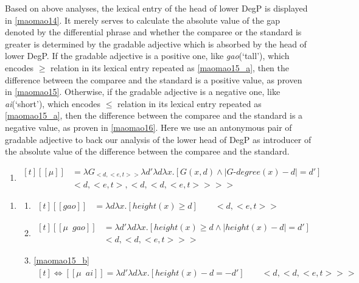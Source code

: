 \documentclass{ctexart}
\begin{document}
Based on above analyses, the lexical entry of the head of lower DegP is displayed in \ref{maomao14}.  It merely serves to calculate the absolute value of the gap denoted by the differential phrase and whether the comparee or the standard is greater is determined by the gradable adjective which is absorbed by the head of lower DegP. If the gradable adjective is a positive one, like \textit{gao}(`tall'), which encodes $\geq$ relation in its lexical entry repeated as \ref{maomao15_a}, then the difference between the comparee and the standard is a positive value, as proven in \ref{maomao15}. Otherwise, if the gradable adjective is a negative one, like \textit{ai}(`short'), which encodes $\leq$ relation in its lexical entry repeated as \ref{maomao15_a}, then the difference between the comparee and the standard is a negative value, as proven in \ref{maomao16}. Here we use an antonymous pair of gradable adjective to back our analysis of the lower head of DegP as introducer  of the absolute value of the difference between the comparee and the standard.

\begin{enumerate}
    \item \label{maomao14}
    $\begin{aligned}[t]
        [\![\mu]\!] &= \lambda G_{<d,<e,t>>} \lambda d' \lambda d \lambda x.[G(x,d) \land | G \mbox{-} degree(x) - d | = d'] \\
        & <d,<e,t>,<d,<d,<e,t>>>>
    \end{aligned}$
\end{enumerate}


\begin{enumerate}
    \item \label{maomao15}
    \begin{enumerate}
        \item \label{maomao15_a}
        $\begin{aligned}[t]
            [\![gao]\!] &= \lambda d \lambda x.[height(x) \geq d] \qquad <d,<e,t>>
        \end{aligned}$

        \item \label{maomao15_b}
        $\begin{aligned}[t]
            [\![\mu \enspace gao]\!] &= \lambda d' \lambda d \lambda x.[height(x) \geq d \land |height(x) - d|=d'] \\
            & <d,<d,<e,t>>>
        \end{aligned}$
        
        \item \label{maomao15_c}
        \ref{maomao15_b}
        $\begin{aligned}[t]
            \Leftrightarrow [\![\mu \enspace ai]\!] = \lambda d' \lambda d \lambda x.[height(x)-d=-d'] \qquad <d,<d,<e,t>>>
        \end{aligned}$
    \end{enumerate}
\end{enumerate}
\end{document}
